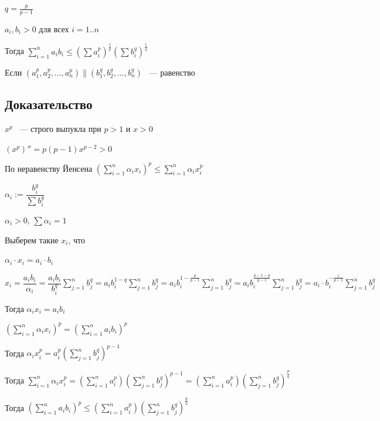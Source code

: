 \documentclass{article}
\begin{document}
            $q = \frac{p}{p - 1}$
            
            $a_i, b_i > 0$ для всех $i = 1..n$
            
            Тогда $\sum\limits^n_{i = 1} a_i b_i \leq (\sum a_i^p)^{\frac{1}{p}} (\sum b_i^q)^{\frac{1}{q}}$
            
            Если $(a_1^p, a_2^p, \ldots, a_n^p) \parallel (b_1^q, b_2^q, \ldots, b_n^q)$ ~--- равенство
            
        \subsection{Доказательство}
            
            $x^p$ ~--- строго выпукла при $p > 1$ и $x > 0$
            
            $(x^p)'' = p(p - 1)x^{p - 2} > 0$
            
            По неравенству Йенсена $\left(\sum\limits_{i = 1}^n \alpha_i x_i \right)^p \leq \sum\limits_{i = 1}^n \alpha_i x_i^p$
            
            $\alpha_i := \dfrac{b_i^q}{\sum b_i^q}$
            
            $\alpha_i > 0$, $\sum \alpha_i = 1$
            
            Выберем такие $x_i$, что
            
            $\alpha_i \cdot x_i = a_i \cdot b_i$
            
            $x_i = \dfrac{a_i b_i}{\alpha_i} = \dfrac{a_i b_i}{b_i^q} \sum\limits_{j = 1}^n b_j^q = a_i b_i^{1 - q} \sum\limits_{j = 1}^n b_j^q = a_i b_i^{1 - \frac{p}{p - 1}} \sum\limits_{j = 1}^n b_j^q = a_i b_i^{\frac{p - 1 - p}{p - 1}} \sum\limits_{j = 1}^n b_j^q = a_i \cdot b_i^{-\frac{1}{p - 1}} \sum\limits_{j = 1}^n b_j^q$
            
            Тогда $\alpha_i x_i = a_i b_i$
            
            $(\sum\limits_{i = 1}^n \alpha_i x_i)^p = (\sum\limits_{i = 1}^n a_i b_i)^p$
            
            Тогда $\alpha_i x_i^p = a_i^p(\sum\limits_{j = 1}^n b_j^q)^{p - 1}$
            
            Тогда $\sum\limits_{i = 1}^n \alpha_i x_i^p = (\sum\limits_{i = 1}^n a_i^p)(\sum\limits_{j = 1}^n b_j^q)^{p - 1} = (\sum\limits_{i = 1}^n a_i^p)(\sum\limits_{j = 1}^n b_j^q)^{\frac{p}{q}}$
            
            Тогда $(\sum_{i = 1}^n a_i b_i)^p \leq (\sum\limits_{i = 1}^n a_i^p)(\sum\limits_{j = 1}^n b_j^q)^{\frac{p}{q}}$
            
\end{document}
